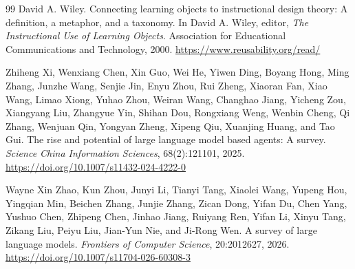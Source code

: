 \documentclass[11pt,letterpaper]{article}
\begin{document}
\begin{thebibliography}{99}
David A. Wiley.
\newblock Connecting learning objects to instructional design theory: A definition, a metaphor, and a taxonomy.
\newblock In David A. Wiley, editor, \emph{The Instructional Use of Learning Objects}. Association for Educational Communications and Technology, 2000.
\newblock \href{https://www.reusability.org/read/}{https://www.reusability.org/read/}

Zhiheng Xi, Wenxiang Chen, Xin Guo, Wei He, Yiwen Ding, Boyang Hong, Ming Zhang, Junzhe Wang, Senjie Jin, Enyu Zhou, Rui Zheng, Xiaoran Fan, Xiao Wang, Limao Xiong, Yuhao Zhou, Weiran Wang, Changhao Jiang, Yicheng Zou, Xiangyang Liu, Zhangyue Yin, Shihan Dou, Rongxiang Weng, Wenbin Cheng, Qi Zhang, Wenjuan Qin, Yongyan Zheng, Xipeng Qiu, Xuanjing Huang, and Tao Gui.
\newblock The rise and potential of large language model based agents: A survey.
\newblock \emph{Science China Information Sciences}, 68(2):121101, 2025.
\newblock \href{https://doi.org/10.1007/s11432-024-4222-0}{https://doi.org/10.1007/s11432-024-4222-0}

Wayne Xin Zhao, Kun Zhou, Junyi Li, Tianyi Tang, Xiaolei Wang, Yupeng Hou, Yingqian Min, Beichen Zhang, Junjie Zhang, Zican Dong, Yifan Du, Chen Yang, Yushuo Chen, Zhipeng Chen, Jinhao Jiang, Ruiyang Ren, Yifan Li, Xinyu Tang, Zikang Liu, Peiyu Liu, Jian-Yun Nie, and Ji-Rong Wen.
\newblock A survey of large language models.
\newblock \emph{Frontiers of Computer Science}, 20:2012627, 2026.
\newblock \href{https://doi.org/10.1007/s11704-026-60308-3}{https://doi.org/10.1007/s11704-026-60308-3}

\end{thebibliography}
\end{document}
